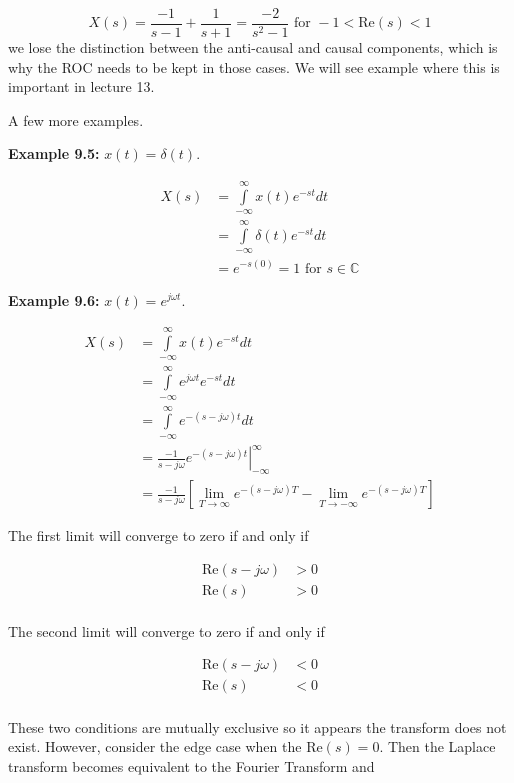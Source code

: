 \documentclass{article}
\begin{document}
\[
X(s) = \frac{-1}{s-1} + \frac{1}{s+1} = \frac{-2}{s^2 - 1} \text{ for } -1 < \text{Re}(s) < 1
\]
we lose the distinction between the anti-causal and causal components, which is why the ROC needs to be kept in those cases. We will see example where this is important in lecture 13.

A few more examples.

\textbf{Example 9.5:} $x(t) = \delta(t)$.

\begin{align}
  X(s) &= \int\limits_{-\infty}^{\infty} x(t) e^{-st} dt\\
  &= \int\limits_{-\infty}^{\infty} \delta(t) e^{-st} dt\\
  &= e^{-s(0)} = 1\text{ for } s\in\mathbb{C}
\end{align}

\textbf{Example 9.6:} $x(t) = e^{j\omega t}$.

\begin{align}
  X(s) &= \int\limits_{-\infty}^{\infty} x(t) e^{-st} dt\\
  &= \int\limits_{-\infty}^{\infty} e^{j\omega t} e^{-st} dt\\
  &= \int\limits_{-\infty}^{\infty} e^{-(s-j\omega)t} dt\\
  &= \frac{-1}{s-j\omega} \left. e^{-(s-j\omega)t} \right|_{-\infty}^{\infty}\\
  &= \frac{-1}{s-j\omega} \left[ \lim_{T\rightarrow \infty} e^{-(s-j\omega)T} -  \lim_{T\rightarrow -\infty} e^{-(s-j\omega)T} \right]
\end{align}

The first limit will converge to zero if and only if

\begin{align}
  \text{Re}(s-j\omega) &> 0\\
  \text{Re}(s) &> 0\\
\end{align}

The second limit will converge to zero if and only if

\begin{align}
  \text{Re}(s-j\omega) &< 0\\
  \text{Re}(s) &< 0\\
\end{align}

These two conditions are mutually exclusive so it appears the transform does not exist. However, consider the edge case when the $\text{Re}(s) = 0$. Then the Laplace transform becomes equivalent to the Fourier Transform and
\end{document}

